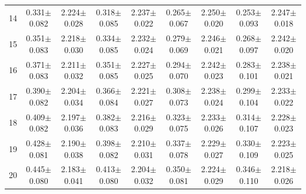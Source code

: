 \begin{table}[H]
{\begin{tabular}{c cc cc cc cc}
14 & 0.331$\pm$0.082 & 2.224$\pm$0.028 & 0.318$\pm$0.085 & 2.237$\pm$0.022 & 0.265$\pm$0.067 & 2.250$\pm$0.020 & 0.253$\pm$0.093 & 2.247$\pm$0.018 \\
15 & 0.351$\pm$0.083 & 2.218$\pm$0.030 & 0.334$\pm$0.085 & 2.232$\pm$0.024 & 0.279$\pm$0.069 & 2.246$\pm$0.021 & 0.268$\pm$0.097 & 2.242$\pm$0.020 \\
16 & 0.371$\pm$0.083 & 2.211$\pm$0.032 & 0.351$\pm$0.085 & 2.227$\pm$0.025 & 0.294$\pm$0.070 & 2.242$\pm$0.023 & 0.283$\pm$0.101 & 2.238$\pm$0.021 \\
17 & 0.390$\pm$0.082 & 2.204$\pm$0.034 & 0.366$\pm$0.084 & 2.221$\pm$0.027 & 0.308$\pm$0.073 & 2.238$\pm$0.024 & 0.299$\pm$0.104 & 2.233$\pm$0.022 \\
18 & 0.409$\pm$0.082 & 2.197$\pm$0.036 & 0.382$\pm$0.083 & 2.216$\pm$0.029 & 0.323$\pm$0.075 & 2.233$\pm$0.026 & 0.314$\pm$0.107 & 2.228$\pm$0.023 \\
19 & 0.428$\pm$0.081 & 2.190$\pm$0.038 & 0.398$\pm$0.082 & 2.210$\pm$0.031 & 0.337$\pm$0.078 & 2.229$\pm$0.027 & 0.330$\pm$0.109 & 2.223$\pm$0.025 \\
20 & 0.445$\pm$0.080 & 2.183$\pm$0.041 & 0.413$\pm$0.080 & 2.204$\pm$0.032 & 0.350$\pm$0.081 & 2.224$\pm$0.029 & 0.346$\pm$0.110 & 2.218$\pm$0.026 \\

\bottomrule

\end{tabular}
}
\end{table}
